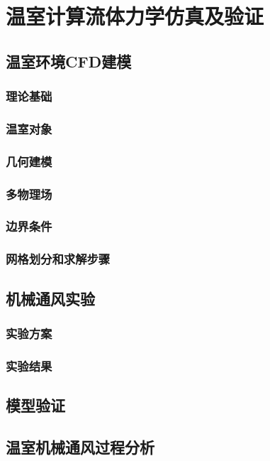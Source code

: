 

\chapter{温室计算流体力学仿真及验证}
\label{chapter:CFD}

\section{温室环境CFD建模}
	\subsection{理论基础}
	\subsection{温室对象}
	\subsection{几何建模}
	\subsection{多物理场}
	\subsection{边界条件}
	\subsection{网格划分和求解步骤}

\section{机械通风实验}
	\subsection{实验方案}
	\subsection{实验结果}
	
\section{模型验证}

\section{温室机械通风过程分析}

